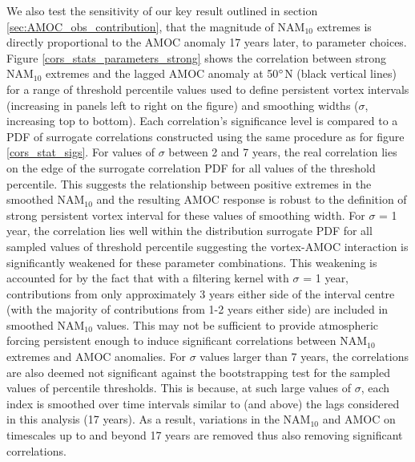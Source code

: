 We also test the sensitivity of our key result outlined in section \ref{sec:AMOC_obs_contribution}, that the magnitude of NAM$_{10}$ extremes is directly proportional to the AMOC anomaly 17 years later, to parameter choices. Figure \ref{cors_stats_parameters_strong} shows the correlation between strong NAM$_{10}$ extremes and the lagged AMOC anomaly at 50$\degree$N (black vertical lines) for a range of threshold percentile values used to define persistent vortex intervals (increasing in panels left to right on the figure) and smoothing widths ($\sigma$, increasing top to bottom). Each correlation's significance level is compared to a PDF of surrogate correlations constructed using the same procedure as for figure \ref{cors_stat_sigs}. For values of $\sigma$ between 2 and 7 years, the real correlation lies on the edge of the surrogate correlation PDF for all values of the threshold percentile. This suggests the relationship between positive extremes in the smoothed NAM$_{10}$ and the resulting AMOC response is robust to the definition of strong persistent vortex interval for these values of smoothing width. For $\sigma$ = 1 year, the correlation lies well within the distribution surrogate PDF for all sampled values of threshold percentile suggesting the vortex-AMOC interaction is significantly weakened for these parameter combinations. This weakening is accounted for by the fact that with a filtering kernel with $\sigma$ = 1 year, contributions from only approximately 3 years either side of the interval centre (with the majority of contributions from 1-2 years either side) are included in smoothed NAM$_{10}$ values. This may not be sufficient to provide atmospheric forcing persistent enough to induce significant correlations between NAM$_{10}$ extremes and AMOC anomalies. For $\sigma$ values larger than 7 years, the correlations are also deemed not significant against the bootstrapping test for the sampled values of percentile thresholds. This is because, at such large values of $\sigma$, each index is smoothed over time intervals similar to (and above) the lags considered in this analysis (17 years). As a result, variations in the NAM$_{10}$ and AMOC on timescales up to and beyond 17 years are removed thus also removing significant correlations.

